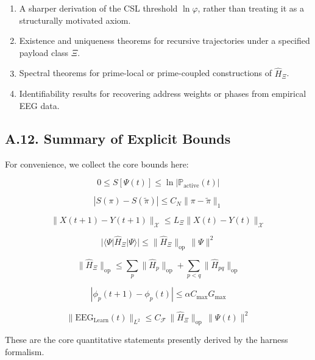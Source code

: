 \documentclass[11pt]{article}
\begin{document}
\begin{enumerate}
  \item A sharper derivation of the CSL threshold $\ln\varphi$, rather than treating it as a structurally motivated axiom. \cite{GoldenEEG}
  \item Existence and uniqueness theorems for recursive trajectories under a specified payload class $\Xi$.
  \item Spectral theorems for prime-local or prime-coupled constructions of $\hat{H}_\Xi$.
  \item Identifiability results for recovering address weights or phases from empirical EEG data.
\end{enumerate}

\subsection*{A.12. Summary of Explicit Bounds}

For convenience, we collect the core bounds here:

\[
0 \le S[\Psi(t)] \le \ln |\mathbb{P}_{\mathrm{active}}(t)|
\]

\[
|S(\pi)-S(\tilde{\pi})| \le C_N \|\pi-\tilde{\pi}\|_1
\]

\[
\|X(t+1)-Y(t+1)\|_{\mathcal{X}}
\le
L_\Xi \|X(t)-Y(t)\|_{\mathcal{X}}
\]

\[
\big|\langle \Psi \vert \hat{H}_\Xi \vert \Psi \rangle\big|
\le
\|\hat{H}_\Xi\|_{\mathrm{op}} \,\|\Psi\|^2
\]

\[
\|\hat{H}_\Xi\|_{\mathrm{op}}
\le
\sum_p \|\hat{H}_p\|_{\mathrm{op}}
+
\sum_{p<q}\|\hat{H}_{pq}\|_{\mathrm{op}}
\]

\[
|\phi_p(t+1)-\phi_p(t)|
\le
\alpha C_{\max} G_{\max}
\]

\[
\|\mathrm{EEG}_{\mathrm{Learn}}(t)\|_{L^2}
\le
C_{\mathcal{F}}\,\|\hat{H}_\Xi\|_{\mathrm{op}}\,\|\Psi(t)\|^2
\]

These are the core quantitative statements presently derived by the harness formalism.

\nocite{*}
  
  
\end{document}

